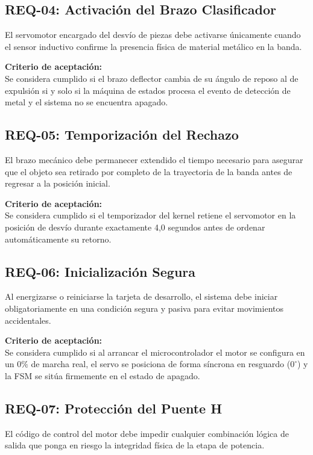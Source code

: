 \documentclass[12pt, letterpaper]{article}
\begin{document}
\subsection{REQ-04: Activación del Brazo Clasificador}
El servomotor encargado del desvío de piezas debe activarse únicamente cuando el sensor inductivo confirme la presencia física de material metálico en la banda.

\vspace{0.5cm}

\noindent \textbf{Criterio de aceptación:} \\
Se considera cumplido si el brazo deflector cambia de su ángulo de reposo al de expulsión si y solo si la máquina de estados procesa el evento de detección de metal y el sistema no se encuentra apagado.

\subsection{REQ-05: Temporización del Rechazo}
El brazo mecánico debe permanecer extendido el tiempo necesario para asegurar que el objeto sea retirado por completo de la trayectoria de la banda antes de regresar a la posición inicial.

\vspace{0.5cm}

\noindent \textbf{Criterio de aceptación:} \\
Se considera cumplido si el temporizador del kernel retiene el servomotor en la posición de desvío durante exactamente 4,0 segundos antes de ordenar automáticamente su retorno.

\subsection{REQ-06: Inicialización Segura}
Al energizarse o reiniciarse la tarjeta de desarrollo, el sistema debe iniciar obligatoriamente en una condición segura y pasiva para evitar movimientos accidentales.

\vspace{0.5cm}

\noindent \textbf{Criterio de aceptación:} \\
Se considera cumplido si al arrancar el microcontrolador el motor se configura en un $0\%$ de marcha real, el servo se posiciona de forma síncrona en resguardo ($0^\circ$) y la FSM se sitúa firmemente en el estado de apagado.

\subsection{REQ-07: Protección del Puente H}
El código de control del motor debe impedir cualquier combinación lógica de salida que ponga en riesgo la integridad física de la etapa de potencia.
\end{document}
